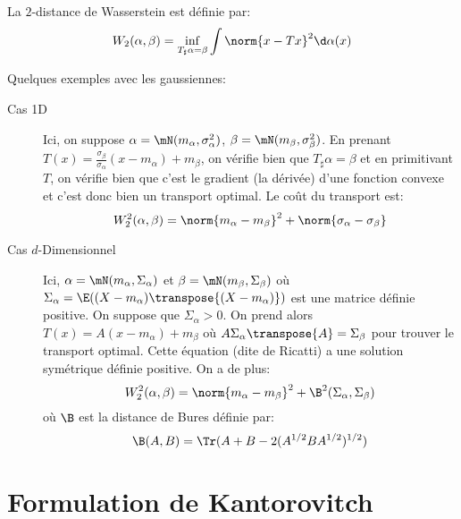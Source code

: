 \documentclass[info, math, french]{mpb-cours}
\begin{document}
\begin{definition}
	La $2$-distance de Wasserstein est définie par:
	\begin{equation*}
		W_{2}(\alpha, \beta) = \inf_{T_{\sharp}\alpha = \beta} \int \norm{x - Tx}^{2}\d\alpha(x)
	\end{equation*}
\end{definition}

Quelques exemples avec les gaussiennes:
\begin{description}
	\item[Cas 1D] Ici, on suppose $\alpha = \mN(m_{\alpha}, \sigma_{\alpha}^{2})$, $\beta = \mN(m_{\beta}, \sigma_{\beta}^{2})$.
	      En prenant $T(x) = \frac{\sigma_{\beta}}{\sigma_{\alpha}}(x - m_{\alpha}) + m_{\beta}$, on vérifie bien que $T_{\sharp}\alpha = \beta$ et en primitivant $T$, on vérifie bien que c'est le gradient (la dérivée) d'une fonction convexe et c'est donc bien un transport optimal.
	      Le coût du transport est:
	      \begin{equation*}
		      W_{2}^{2}(\alpha, \beta) = \norm{m_{\alpha} - m_{\beta}}^{2} + \norm{\sigma_{\alpha} - \sigma_{\beta}}
	      \end{equation*}
	\item[Cas $d$-Dimensionnel] Ici, $\alpha = \mN(m_{\alpha}, \Sigma_{\alpha})$ et $\beta = \mN(m_{\beta}, \Sigma_{\beta})$ où $\Sigma_{\alpha} = \E((X- m_{\alpha})\transpose{(X-m_{\alpha})})$ est une matrice définie positive.
	      On suppose que $\Sigma_{\alpha} > 0$.
	      On prend alors $T(x) = A(x - m_{\alpha}) + m_{\beta}$ où $A\Sigma_{\alpha}\transpose{A} = \Sigma_{\beta}$ pour trouver le transport optimal.
	      Cette équation (dite de Ricatti) a une solution symétrique définie positive.
	      On a de plus:
	      \begin{equation*}
		      W_{2}^{2}(\alpha, \beta) = \norm{m_{\alpha} - m_{\beta}}^{2} + \B^{2}(\Sigma_{\alpha}, \Sigma_{\beta})
	      \end{equation*}
	      où $\B$ est la distance de Bures définie par:
	      \begin{equation*}
		      \B(A, B) = \Tr(A + B - 2(A^{1/2}BA^{1/2})^{1/2})
	      \end{equation*}
\end{description}

\section{Formulation de Kantorovitch}
\end{document}

